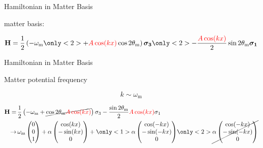 \documentclass[9pt]{beamer}
\begin{document}
\begin{darkframes}
\begin{frame}{Hamiltonian in Matter Basis}


\begin{tcolorbox}[title=Hamiltonian]

 matter basis:


\begin{equation*}
    \mathbf H = \frac{1}{2}\left( - \omega_{\mathrm{m}}
    \only<2>{
    + {\color{red}A\cos(kx)} \cos 2\theta_{\mathrm{m}}
    }
    \right) \boldsymbol{\sigma_3}
    \only<2>{
    - \frac{{\color{red}A\cos(kx) } }{2} \sin 2\theta_{\mathrm{m}} \boldsymbol{\sigma_1}
    }
\end{equation*}


\end{tcolorbox}






\end{frame}






\begin{frame}{Hamiltonian in Matter Basis}




Matter potential frequency

\begin{equation*}
    k\sim \omega_{\mathrm m}
\end{equation*}


\begin{align*}
    \mathbf {H} =\,& \frac{1}{2}\left( - \omega_{\mathrm{m}}
    +\cancel{
     \cos 2\theta_{\mathrm{m}}{\color{red}A\cos(kx)} } \right) \sigma_3 - \frac{  \sin 2\theta_{\mathrm{m}
    }
    }{2}{\color{red}A \cos(kx)}  \sigma_1 \\
    \to\, &  \omega_{\mathrm m}\begin{pmatrix}
    0\\
    0\\
    1
    \end{pmatrix} + \alpha \begin{pmatrix}
    \cos (kx)\\
    -\sin(k x)\\
    0
    \end{pmatrix}  + \only<1>{\alpha \begin{pmatrix}
    \cos (-kx)\\
    -\sin( - k x)\\
    0
    \end{pmatrix}
    }
    \only<2>{\cancel{\alpha \begin{pmatrix}
    \cos (-kx)\\
    -\sin( - k x)\\
    0
    \end{pmatrix}
    }
    }
\end{align*}


\end{frame}
\end{darkframes}
\end{document}
